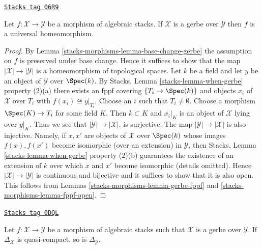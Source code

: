 \begin{lemma}
\label{stacks-morphisms-lemma-gerbe-bijection-points}
\href{https://stacks.math.columbia.edu/tag/06R9}{\texttt{Stacks tag 06R9}}

Let $f : \mathcal{X} \to \mathcal{Y}$ be a morphism of algebraic stacks.
If $\mathcal{X}$ is a gerbe over $\mathcal{Y}$ then $f$ is a
universal homeomorphism.
\end{lemma}

\begin{proof}
By Lemma \ref{stacks-morphisms-lemma-base-change-gerbe} the assumption on $f$ is
preserved under base change. Hence it suffices to show that the map
$|\mathcal{X}| \to |\mathcal{Y}|$ is a homeomorphism of topological spaces.
Let $k$ be a field and let $y$ be an object
of $\mathcal{Y}$ over $\Spec(k)$. By
Stacks, Lemma \ref{stacks-lemma-when-gerbe} property (2)(a)
there exists an fppf covering $\{T_i \to \Spec(k)\}$
and objects $x_i$ of $\mathcal{X}$ over $T_i$ with $f(x_i) \cong y|_{T_i}$.
Choose an $i$ such that $T_i \not = \emptyset$. Choose a
morphism $\Spec(K) \to T_i$ for some field $K$.
Then $k \subset K$ and $x_i|_K$ is an object of $\mathcal{X}$ lying
over $y|_K$. Thus we see that
$|\mathcal{Y}| \to |\mathcal{X}|$. is surjective. The map
$|\mathcal{Y}| \to |\mathcal{X}|$ is also injective. Namely, if
$x, x'$ are objects of $\mathcal{X}$ over $\Spec(k)$ whose images
$f(x), f(x')$ become isomorphic (over an extension) in $\mathcal{Y}$, then
Stacks, Lemma \ref{stacks-lemma-when-gerbe} property (2)(b)
guarantees the existence of an extension of $k$ over which $x$ and $x'$
become isomorphic (details omitted).
Hence $|\mathcal{X}| \to |\mathcal{Y}|$ is continuous and bijective
and it suffices to show that it is also open.
This follows from
Lemmas \ref{stacks-morphisms-lemma-gerbe-fppf} and \ref{stacks-morphisms-lemma-fppf-open}.
\end{proof}

\begin{lemma}
\label{stacks-morphisms-lemma-gerbe-diagonal-quasi-compact}
\href{https://stacks.math.columbia.edu/tag/0DQL}{\texttt{Stacks tag 0DQL}}

Let $f : \mathcal{X} \to \mathcal{Y}$ be a morphism of algebraic stacks
such that $\mathcal{X}$ is a gerbe over $\mathcal{Y}$.
If $\Delta_\mathcal{X}$ is quasi-compact, so is $\Delta_\mathcal{Y}$.
\end{lemma}

